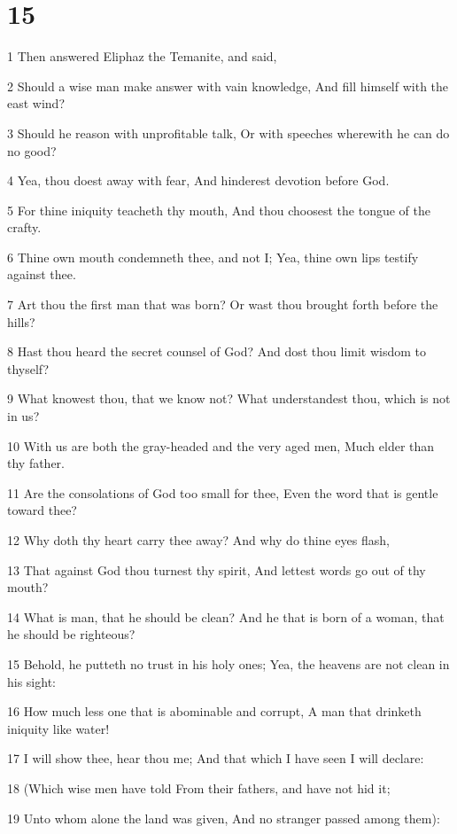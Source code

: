 \chapter{15}

\par 1 Then answered Eliphaz the Temanite, and said,
\par 2 Should a wise man make answer with vain knowledge, And fill himself with the east wind?
\par 3 Should he reason with unprofitable talk, Or with speeches wherewith he can do no good?
\par 4 Yea, thou doest away with fear, And hinderest devotion before God.
\par 5 For thine iniquity teacheth thy mouth, And thou choosest the tongue of the crafty.
\par 6 Thine own mouth condemneth thee, and not I; Yea, thine own lips testify against thee.
\par 7 Art thou the first man that was born? Or wast thou brought forth before the hills?
\par 8 Hast thou heard the secret counsel of God? And dost thou limit wisdom to thyself?
\par 9 What knowest thou, that we know not? What understandest thou, which is not in us?
\par 10 With us are both the gray-headed and the very aged men, Much elder than thy father.
\par 11 Are the consolations of God too small for thee, Even the word that is gentle toward thee?
\par 12 Why doth thy heart carry thee away? And why do thine eyes flash,
\par 13 That against God thou turnest thy spirit, And lettest words go out of thy mouth?
\par 14 What is man, that he should be clean? And he that is born of a woman, that he should be righteous?
\par 15 Behold, he putteth no trust in his holy ones; Yea, the heavens are not clean in his sight:
\par 16 How much less one that is abominable and corrupt, A man that drinketh iniquity like water!
\par 17 I will show thee, hear thou me; And that which I have seen I will declare:
\par 18 (Which wise men have told From their fathers, and have not hid it;
\par 19 Unto whom alone the land was given, And no stranger passed among them):
